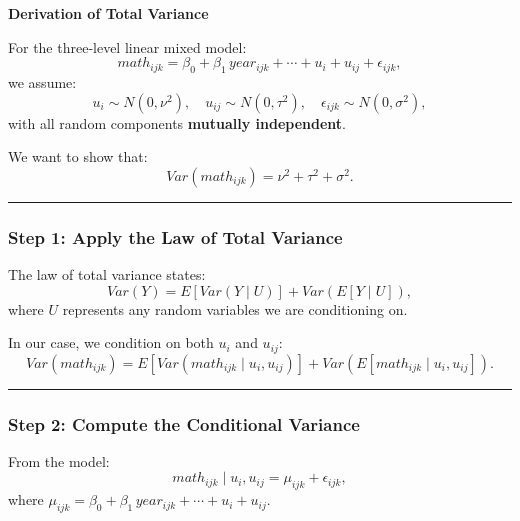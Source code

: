 \documentclass[
  letterpaper,
  DIV=11,
  numbers=noendperiod]{scrreprt}
\begin{document}
\begin{tcolorbox}[enhanced jigsaw, rightrule=.15mm, breakable, left=2mm, colframe=quarto-callout-tip-color-frame, opacityback=0, leftrule=.75mm, toprule=.15mm, colback=white, arc=.35mm, bottomrule=.15mm]

\textbf{Derivation of Total Variance}\vspace{2mm}

For the three-level linear mixed model: \[
math_{ijk} = \beta_0 + \beta_1 \, year_{ijk} + \cdots + u_i + u_{ij} + \epsilon_{ijk},
\] we assume: \[
u_i \sim N(0, \nu^2), \quad u_{ij} \sim N(0, \tau^2), \quad \epsilon_{ijk} \sim N(0, \sigma^2),
\] with all random components \textbf{mutually independent}.

We want to show that: \[
Var(math_{ijk}) = \nu^2 + \tau^2 + \sigma^2.
\]

\begin{center}\rule{0.5\linewidth}{0.5pt}\end{center}

\hypertarget{step-1-apply-the-law-of-total-variance}{%
\subsubsection*{Step 1: Apply the Law of Total
Variance}\label{step-1-apply-the-law-of-total-variance}}

The law of total variance states: \[
Var(Y) = E[Var(Y \mid U)] + Var(E[Y \mid U]),
\] where \(U\) represents any random variables we are conditioning on.

In our case, we condition on both \(u_i\) and \(u_{ij}\): \[
Var(math_{ijk}) = E[Var(math_{ijk} \mid u_i, u_{ij})] + Var(E[math_{ijk} \mid u_i, u_{ij}]).
\]

\begin{center}\rule{0.5\linewidth}{0.5pt}\end{center}

\hypertarget{step-2-compute-the-conditional-variance}{%
\subsubsection*{Step 2: Compute the Conditional
Variance}\label{step-2-compute-the-conditional-variance}}

From the model: \[
math_{ijk} \mid u_i, u_{ij} = \mu_{ijk} + \epsilon_{ijk},
\] where
\(\mu_{ijk} = \beta_0 + \beta_1 \, year_{ijk} + \cdots + u_i + u_{ij}\).


\end{tcolorbox}
\end{document}
